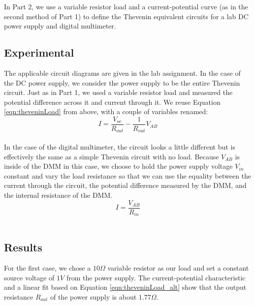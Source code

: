 \documentclass[11pt]{article}
\begin{document}
    In Part 2, we use a variable resistor load and a current-potential curve (as in the second method of Part 1) to define the Thevenin equivalent circuits for a lab DC power supply and digital multimeter. \\
    
\subsection{Experimental}
    The applicable circuit diagrams are given in the lab assignment.
    In the case of the DC power supply, we consider the power supply to be the entire Thevenin circuit. Just as in Part 1, we used a variable resistor load and measured the potential difference across it and current through it. We reuse Equation \ref{eqn:theveninLoad} from above, with a couple of variables renamed: \\
    
    \begin{equation}
        \label{eqn:theveninLoad_alt}
        I = \frac{V_{oc}}{R_{out}} - \frac{1}{R_{out}} V_{AB}
    \end{equation} \\

    In the case of the digital multimeter, the circuit looks a little different but is effectively the same as a simple Thevenin circuit with no load. Because $V_{AB}$ is inside of the DMM in this case, we choose to hold the power supply voltage $V_{in}$ constant and vary the load resistance so that we can use the equality between the current through the circuit, the potential difference measured by the DMM, and the internal resistance of the DMM. \\
    
    \begin{equation}
        \label{eqn:thevenin_alt}
        I = \frac{V_{AB}}{R_{in}}        
    \end{equation} \\

\subsection{Results}
    For the first case, we chose a \(10 \Omega\) variable resistor as our load and set a constant source voltage of \(1 V\) from the power supply. The current-potential characteristic and a linear fit based on Equation \ref{eqn:theveninLoad_alt} show that the output resistance \(R_{out}\) of the power supply is about \(1.77 \Omega\). \\
    
\end{document}
